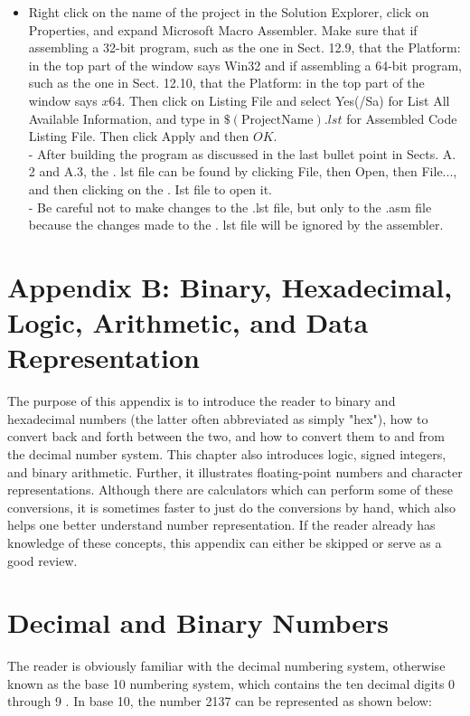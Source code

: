 \documentclass[10pt]{book}
\begin{document}
\begin{itemize}
  \item Right click on the name of the project in the Solution Explorer, click on Properties, and expand Microsoft Macro Assembler. Make sure that if assembling a 32-bit program, such as the one in Sect. 12.9, that the Platform: in the top part of the window says Win32 and if assembling a 64-bit program, such as the one in Sect. 12.10, that the Platform: in the top part of the window says $x 64$. Then click on Listing File and select Yes(/Sa) for List All Available Information, and type in $\$(\text{ProjectName}).lst$ for Assembled Code Listing File. Then click Apply and then $O K$.\\
- After building the program as discussed in the last bullet point in Sects. A. 2 and A.3, the . lst file can be found by clicking File, then Open, then File..., and then clicking on the . Ist file to open it.\\
- Be careful not to make changes to the .lst file, but only to the .asm file because the changes made to the . lst file will be ignored by the assembler.
\end{itemize}

\section{Appendix B: Binary, Hexadecimal, Logic, Arithmetic, and Data Representation}
The purpose of this appendix is to introduce the reader to binary and hexadecimal numbers (the latter often abbreviated as simply "hex"), how to convert back and forth between the two, and how to convert them to and from the decimal number system. This chapter also introduces logic, signed integers, and binary arithmetic. Further, it illustrates floating-point numbers and character representations. Although there are calculators which can perform some of these conversions, it is sometimes faster to just do the conversions by hand, which also helps one better understand number representation. If the reader already has knowledge of these concepts, this appendix can either be skipped or serve as a good review.

\section{Decimal and Binary Numbers}
The reader is obviously familiar with the decimal numbering system, otherwise known as the base 10 numbering system, which contains the ten decimal digits 0 through 9 . In base 10, the number 2137 can be represented as shown below:
\end{document}
